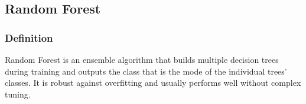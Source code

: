 \subsection{Random Forest}
\subsubsection{Definition}

Random Forest is an ensemble algorithm that builds multiple decision trees during training and outputs the class that is the mode of the individual trees' classes. It is robust against overfitting and usually performs well without complex tuning.
